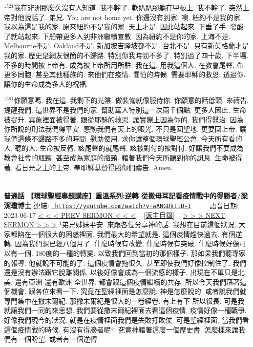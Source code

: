 \documentclass{book}
\begin{document}
$^{1521}$我在非洲那麼久沒有人知道.
我不幹了.
軟趴趴腳躺在甲板上.
我不幹了.
突然上帝對他說話了.
弟兄.
You are not home yet.
你還沒有到家.
噢.
紐約不是我的家.
我以為這是我的家.
原來紐約不是我的家.
天上才是.
因此站起來.
下垂了手.
發酸了就站起來.
下船帶更多人到非洲繼續宣教.
因為紐約不是你的家.
上海不是.
Melbourne不是.
Oakland不是.
新加坡吉隆坡都不是.
台北不是.
只有新英格蘭才是我的家.
歷史是網友很簡的不歸路.
特別你我時間不多了.
特別過了四十歲.
下半場.
不多的時間被上帝有.
成為被上帝所用所駐.
我在這.
用我這個人.
在教會尾聲.
帶更多同胞.
甚至其他種族的.
來他們在疫情.
懼怕的時候.
需要耶穌的救恩.
透過你.
讓你的生命成為多人的祝福.

$^{1561}$你願意嗎.
我在這.
我剩下的光陰.
做裝備就像服侍你.
你願意的話低頭.
來禱告.
提醒我們.
這世界不是我們的家.
幫助華人特別這一次兩千個點.
更多人因此.
生命被提升.
異象裡面被得著.
跟從耶穌的救恩.
讓實際上因為你的.
我們得醫治.
因為你所說的刑法我們得平安.
感動我們有天上的眼光.
不只是回聖地.
更要回上帝.
讓我們這條不歸路不多的時間.
慰助使用.
求你讓整個環球聖經公會.
今天所有看的人.
聽的人.
生命被反轉.
該尾聲的就尾聲.
該被對付的被對付.
好讓我們不要成為教會社會的瓶頸.
甚至成為家庭的瓶頸.
藉著我們今天所聽到你的訊息.
生命被得著.
看日光之上的上帝.
奉耶穌基督得勝你們禱告.
Amen.
\newpage



\section{}
\label{sec:wANGDktiD_I}
\textbf{普通話 【環球聖經專題講座】重溫系列:逆轉 從撒母耳記看疫情戰中的得勝者/梁潔瓊博士}
\newline
\newline
連結: \href{https://youtube.com/watch?v=wANGDktiD-I}{\texttt{ https://youtube.com/watch?v=wANGDktiD-I}} ~~~~ 語音日期: 2023-06-17 
\newline
\newline
\hyperref[sec:jEVzLmVIzKo]{\small{< < < PREV SERMON < < <}}
~
\hyperref[sec:index]{\small{[返主目錄]}}
~
\hyperref[sec:HoZsRpmaJpU]{\small{> > > NEXT SERMON > > >}}
\newline
\newline
$^{1}$弟兄姊妹平安.
來跟各位分享神的話.
我想在目前這個狀況.
大家都陷在一個很大的困惑裡面.
我們最大的希望就是.
這個疫情趕快過去.
有個逆轉.
因為我們想已經八個月了.
什麼時候有改變.
什麼時候有突破.
什麼時候好像可以有一個.
180度的一種的轉變.
以致我們回到當初的那個樣子.
那如果我們聽專家的報導.
他就說不可能的了.
這個疫情會拖很久.
甚至即使我們好像控制住了.
我們還是沒有辦法跟它脫離關係.
以後好像會成為一個流感的樣子.
出現在不單只是北美.
還有亞洲 還有歐洲 全世界.
都會跟這個疫情繼續的共存.
所以今天我們藉著這個機會.
跟各位來看一下.
究竟在聖經裡面是怎麼說.
神是怎麼說的.
或者說我們就專門集中在撒末爾紀.
那撒末爾紀是很大的一卷經卷.
有上有下 所以很長.
可是我就讓我們一同的來思想.
我們要從撒末爾紀裡面去看這個疫情.
疫情好像一種戰爭.
好像我們現今的狀況.
就是在疫情裡面我們是失敗打敗仗.
可是聖經裡面.
當我們看這個疫情戰的時候.
有沒有得勝者呢?.
究竟神藉著這麼一個歷史書.
怎麼樣來讓我們有一個盼望.
或者有一個逆轉.
\end{document}
